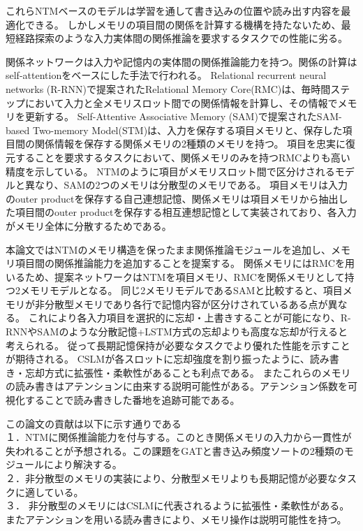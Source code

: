 これらNTMベースのモデルは学習を通して書き込みの位置や読み出す内容を最適化できる。
しかしメモリの項目間の関係を計算する機構を持たないため、最短経路探索のような入力実体間の関係推論を要求するタスクでの性能に劣る。

関係ネットワークは入力や記憶内の実体間の関係推論能力を持つ。関係の計算はself-attention\cite{transformer}をベースにした手法で行われる。
Relational recurrent neural networks (R-RNN)\cite{rrnn}で提案されたRelational Memory Core(RMC)は、毎時間ステップにおいて入力と全メモリスロット間での関係情報を計算し、その情報でメモリを更新する。
Self-Attentive Associative Memory (SAM)\cite{sam}で提案されたSAM-based Two-memory Model(STM)は、入力を保存する項目メモリと、保存した項目間の関係情報を保存する関係メモリの2種類のメモリを持つ。
項目を忠実に復元することを要求するタスクにおいて、関係メモリのみを持つRMCよりも高い精度を示している。
NTMのように項目がメモリスロット間で区分けされるモデルと異なり、SAMの2つのメモリは分散型のメモリである。
項目メモリは入力のouter productを保存する自己連想記憶、関係メモリは項目メモリから抽出した項目間のouter productを保存する相互連想記憶として実装されており、各入力がメモリ全体に分散するためである。

本論文ではNTMのメモリ構造を保ったまま関係推論モジュールを追加し、メモリ項目間の関係推論能力を追加することを提案する。
関係メモリにはRMCを用いるため、提案ネットワークはNTMを項目メモリ、RMCを関係メモリとして持つ2メモリモデルとなる。
同じ2メモリモデルであるSAMと比較すると、項目メモリが非分散型メモリであり各行で記憶内容が区分けされているある点が異なる。
これにより各入力項目を選択的に忘却・上書きすることが可能になり、R-RNNやSAMのような分散記憶+LSTM方式の忘却よりも高度な忘却が行えると考えられる。
従って長期記憶保持が必要なタスクでより優れた性能を示すことが期待される。
CSLMが各スロットに忘却強度を割り振ったように、読み書き・忘却方式に拡張性・柔軟性があることも利点である。
またこれらのメモリの読み書きはアテンションに由来する説明可能性がある。アテンション係数を可視化することで読み書きした番地を追跡可能である。


この論文の貢献は以下に示す通りである
\\１．NTMに関係推論能力を付与する。このとき関係メモリの入力から一貫性が失われることが予想される。この課題をGATと書き込み頻度ソートの2種類のモジュールにより解決する。
\\２．非分散型のメモリの実装により、分散型メモリよりも長期記憶が必要なタスクに適している。
\\３． 非分散型のメモリにはCSLMに代表されるように拡張性・柔軟性がある。またアテンションを用いる読み書きにより、メモリ操作は説明可能性を持つ。

